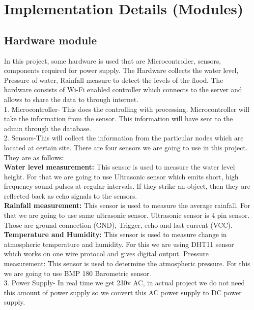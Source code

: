 \documentclass[a4paper,12pt]{report}
\begin{document}
\section{Implementation Details (Modules)}
\subsection{Hardware module }
In this project, some hardware is used that are Microcontroller, sensors, components required for power supply. The Hardware collects the water level, Pressure of water, Rainfall measure to detect the levels of the flood. The hardware consists of Wi-Fi enabled controller which connects to the server and allows to share the data to through internet. \\
1. Microcontroller- This does the controlling with processing. Microcontroller will take the information from the sensor. This information will have sent to the admin through the database. \\
2. Sensors-This will collect the information from the particular nodes which are located at certain site. There are four sensors we are going to use in this project. \\
They are as follows: \\
\textbf{Water level measurement:} This sensor is used to measure the water level height. For that we are going to use Ultrasonic sensor which emits short, high frequency sound pulses at regular intervals. If they strike an object, then they are reflected back as echo signals to the sensors. \\
\textbf{Rainfall measurement:} This sensor is used to measure the average rainfall. For that we are going to use same ultrasonic sensor. Ultrasonic sensor is 4 pin sensor. Those are ground connection (GND), Trigger, echo and last current (VCC). \\
\textbf{Temperature and Humidity:} This sensor is used to measure change in atmospheric temperature and humidity. For this we are using DHT11 sensor which works on one wire protocol and gives digital output. Pressure measurement: This sensor is used to determine the atmospheric pressure. For this we are going to use BMP 180 Barometric sensor. \\
3. Power Supply- In real time we get 230v AC, in actual project we do not need this amount of power supply so we convert this AC power supply to DC power supply. \\
\end{document}
